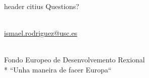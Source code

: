 \documentclass[aspectratio=169]{beamer}
\begin{document}
\begin{frame}
    \begin{center}
    \begin{minipage}{.75\textwidth}%
        \begin{beamercolorbox}[sep=1em, rounded=false, center]{header citius}%
            \Huge Questions?\vspace*{-1ex}%
        \end{beamercolorbox}%
    \end{minipage}
    \\[5pt]
    \hyperlink{mailto:ismael.rodriguez@usc.es}{ismael.rodriguez@usc.es}

    \bigskip

    \\
    Fondo Europeo de Desenvolvemento Rexional\\*
    ``Unha maneira de facer Europa``
  \end{center}

\end{frame}
\end{document}
